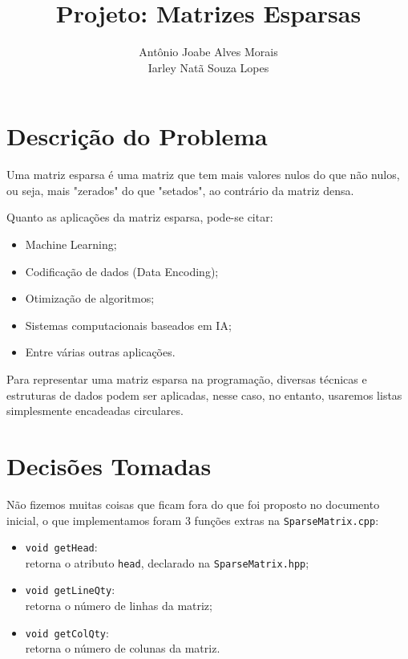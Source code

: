 \documentclass[12pt, letterpaper]{article}
\title{\textbf{Projeto: Matrizes Esparsas}}
\date{}
\author{Antônio Joabe Alves Morais \\ Iarley Natã Souza Lopes}
\begin{document}
	\maketitle

	\section{Descrição do Problema} \label{desc}
		Uma matriz esparsa é uma matriz que tem mais valores nulos do que não nulos, ou seja, mais "zerados" do que "setados", ao contrário da matriz densa.

		Quanto as aplicações da matriz esparsa, pode-se citar: \cite{Brownlee2018, UnivespME2016, Cerebras2019}
		\begin{itemize}
			\item Machine Learning;
			\item Codificação de dados (Data Encoding);
			\item Otimização de algoritmos;
			\item Sistemas computacionais baseados em IA;
			\item Entre várias outras aplicações.
		\end{itemize}

		Para representar uma matriz esparsa na programação, diversas técnicas e estruturas de dados podem ser aplicadas, nesse caso, no entanto, usaremos listas simplesmente encadeadas circulares.
	\section{Decisões Tomadas} \label{decis}
		Não fizemos muitas coisas que ficam fora do que foi proposto no documento inicial, o que implementamos foram 3 funções extras na \verb|SparseMatrix.cpp|:
		\begin{itemize}
			\item \verb|void getHead|: \\
				retorna o atributo \verb|head|, declarado na \verb|SparseMatrix.hpp|;
			\item \verb|void getLineQty|: \\
				retorna o número de linhas da matriz;
			\item \verb|void getColQty|: \\
				retorna o número de colunas da matriz.
		\end{itemize}
\end{document}
